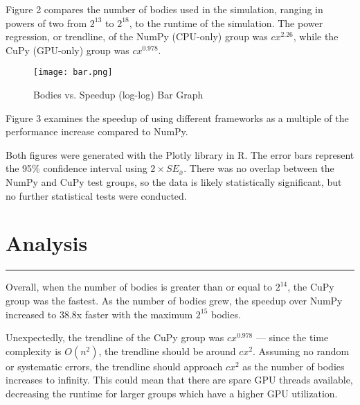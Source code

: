 \documentclass[12pt, letterpaper]{article}
\begin{document}
Figure 2 compares the number of bodies used in the simulation, ranging in 
powers of two from \begin{math}2^{13}\end{math} to 
\begin{math}2^{18}\end{math}, to the runtime of the simulation. The power 
regression, or trendline, of the NumPy (CPU-only) group was 
\begin{math}cx^{2.26}\end{math}, while the CuPy (GPU-only) group was 
\begin{math}cx^{0.978}\end{math}. 

\begin{figure}[H]
\texttt{[image: bar.png]}
\centering
\label{fig:bargraph}
\caption{Bodies vs. Speedup (log-log) Bar Graph}
\end{figure}

Figure 3 examines the speedup of using different frameworks as a multiple 
of the performance increase compared to NumPy. 

Both figures were generated with the Plotly library in R. The error bars 
represent the 95\% confidence interval using \begin{math}2\times 
{SE}_{\bar{x}}\end{math}. There was no overlap between the NumPy and CuPy 
test groups, so the data is likely statistically significant, but no 
further statistical tests were conducted.

\section{Analysis}
\vspace{1pt}\hrule\vspace{12pt}

Overall, when the number of bodies is greater than or equal to 
\begin{math}2^{14}\end{math}, the CuPy group was the fastest. As the 
number of bodies grew, the speedup over NumPy increased to 38.8x faster 
with the maximum \begin{math}2^{15}\end{math} bodies.

Unexpectedly, the trendline of the CuPy group was 
\begin{math}cx^{0.978}\end{math} — since the time complexity is 
\begin{math}O(n^2)\end{math}, the trendline should be around 
\begin{math}cx^2\end{math}. Assuming no random or systematic errors, the 
trendline should approach \begin{math}cx^2\end{math} as the number of 
bodies increases to infinity. This could mean that there are spare GPU 
threads available, decreasing the runtime for larger groups which have a 
higher GPU utilization.
\end{document}
